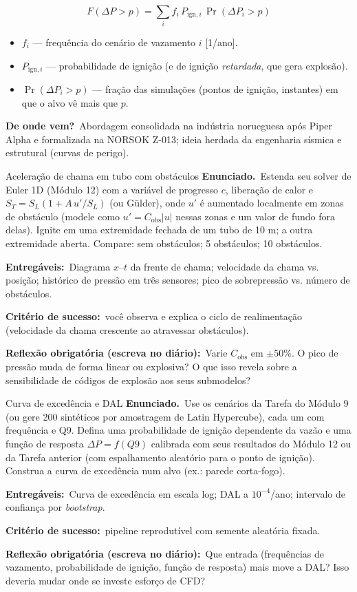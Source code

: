 \documentclass[10pt,a4paper,twocolumn,openany]{report}
\newcommand{\lead}[2]{\par\medskip\noindent{\color{#1}\bfseries #2}\ }
\newenvironment{dicionario}[1][Dicionário da equação]{\lead{azul}{#1.}\small}{\par\medskip}
\newcommand{\origem}{\par\smallskip\noindent\textcolor{azul}{\textbf{De onde vem?}}\ }
\newcommand{\enunciado}{\noindent\textbf{Enunciado.}\ }
\newcommand{\entregaveis}{\par\medskip\noindent\textbf{Entregáveis:}}
\newcommand{\criterio}{\par\medskip\noindent\textbf{Critério de sucesso:}\ }
\newcommand{\reflexao}{\par\medskip\noindent\textbf{Reflexão obrigatória (escreva no diário):}}
\begin{document}
\begin{dicionario}[Dicionário da equação: excedência]
\[
  F(\Delta P>p)=\sum_{i}f_i\,P_{\text{ign},i}\,
  \Pr\!\left(\Delta P_i>p\right)
\]
\begin{itemize}[leftmargin=*,nosep]
  \item $f_i$ --- frequência do cenário de vazamento $i$ [1/ano].
  \item $P_{\text{ign},i}$ --- probabilidade de ignição (e de ignição
        \emph{retardada}, que gera explosão).
  \item $\Pr(\Delta P_i>p)$ --- fração das simulações (pontos de ignição,
        instantes) em que o alvo vê mais que $p$.
\end{itemize}
\origem Abordagem consolidada na indústria norueguesa após Piper Alpha e
formalizada na NORSOK Z-013; ideia herdada da engenharia sísmica e
estrutural (curvas de perigo).
\end{dicionario}


\begin{tarefa}{Aceleração de chama em tubo com obstáculos}
\enunciado Estenda seu solver de Euler 1D (Módulo 12) com a variável de
progresso $c$, liberação de calor e $S_T=S_L(1+A\,u'/S_L)$ (ou Gülder), onde
$u'$ é aumentado localmente em zonas de obstáculo (modele como
$u'=C_{\text{obs}}|u|$ nessas zonas e um valor de fundo fora delas). Ignite em
uma extremidade fechada de um tubo de 10 m; a outra extremidade aberta.
Compare: sem obstáculos; 5 obstáculos; 10 obstáculos.
\entregaveis\ Diagrama $x$--$t$ da frente de chama; velocidade da chama vs.
posição; histórico de pressão em três sensores; pico de sobrepressão vs.
número de obstáculos.
\criterio você observa e explica o ciclo de realimentação (velocidade da
chama crescente ao atravessar obstáculos).
\reflexao\ Varie $C_{\text{obs}}$ em $\pm50\%$. O pico de pressão muda de forma
linear ou explosiva? O que isso revela sobre a sensibilidade de códigos de
explosão aos seus submodelos?
\end{tarefa}

\begin{tarefa}{Curva de excedência e DAL}
\enunciado Use os cenários da Tarefa do Módulo 9 (ou gere 200 sintéticos por
amostragem de Latin Hypercube), cada um com frequência e Q9. Defina uma
probabilidade de ignição dependente da vazão e uma função de resposta
$\Delta P = f(Q9)$ calibrada com seus resultados do Módulo 12 ou da Tarefa
anterior (com espalhamento aleatório para o ponto de ignição). Construa a
curva de excedência num alvo (ex.: parede corta-fogo).
\entregaveis\ Curva de excedência em escala log; DAL a $10^{-4}$/ano;
intervalo de confiança por \emph{bootstrap}.
\criterio pipeline reprodutível com semente aleatória fixada.
\reflexao\ Que entrada (frequências de vazamento, probabilidade de ignição,
função de resposta) mais move a DAL? Isso deveria mudar onde se investe
esforço de CFD?
\end{tarefa}
\end{document}
